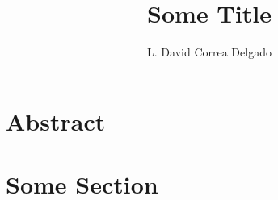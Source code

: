 \documentclass{lgacfancy}
\title{Some Title}
\author[1]{L. David Correa Delgado}
\affil[1]{david.correa.msc@gmail.com}
\begin{document}
\maketitle

\section*{Abstract}
\lipsum[1]

\section*{Some Section}
\lipsum[2]
\end{document}
